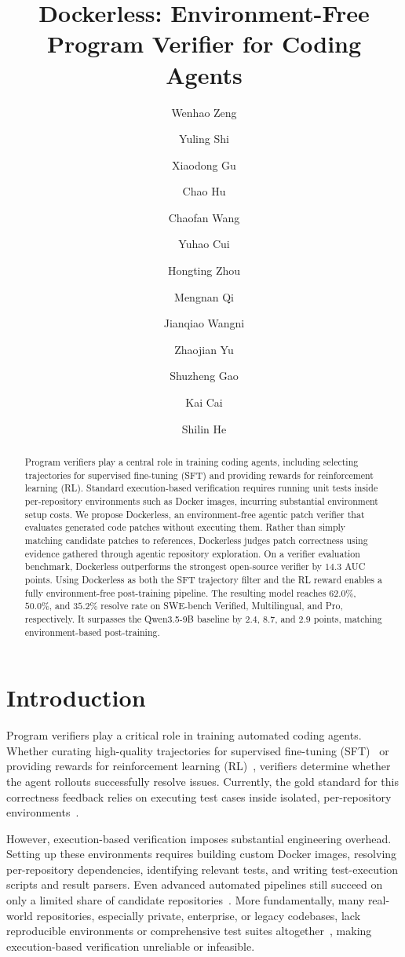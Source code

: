\documentclass{llmxive}
\title{Dockerless: Environment-Free Program Verifier for Coding Agents}
\author{Wenhao Zeng \and Yuling Shi \and Xiaodong Gu \and Chao Hu \and Chaofan Wang \and Yuhao Cui \and Hongting Zhou \and Mengnan Qi \and Jianqiao Wangni \and Zhaojian Yu \and Shuzheng Gao \and Kai Cai \and Shilin He}
\providecommand{\approach}{Dockerless\xspace}
\providecommand{\he}[1]{\textbf{[He: #1]}}
\begin{document}
\maketitle
\begin{abstract}
Program verifiers play a central role in training coding agents, including selecting trajectories for supervised fine-tuning (SFT) and providing rewards for reinforcement learning (RL).
  Standard execution-based verification requires running unit tests inside per-repository environments such as Docker images, incurring substantial environment setup costs.
  We propose \approach, an environment-free agentic patch verifier that evaluates generated code patches without executing them.
  Rather than simply matching candidate patches to references, \approach judges patch correctness using evidence gathered through agentic repository exploration.
  On a verifier evaluation benchmark, \approach outperforms the strongest open-source verifier by $14.3$ AUC points.
  Using \approach as both the SFT trajectory filter and the RL reward enables a fully environment-free post-training pipeline.
  The resulting model reaches $62.0\%$, $50.0\%$, and $35.2\%$ resolve rate on SWE-bench Verified, Multilingual, and Pro, respectively.
  It surpasses the Qwen3.5-9B baseline by $2.4$, $8.7$, and $2.9$ points, matching environment-based post-training.
\end{abstract}
\section{Introduction}
\label{sec:intro}

Program verifiers play a critical role in training automated coding agents. Whether curating high-quality trajectories for supervised fine-tuning (SFT)~\citep{yuan2023scaling,pan2025training,jain2025r2e,zeng2025pruning} or providing rewards for reinforcement learning (RL)~\citep{wei2025swerl,luo2025deepswe}, verifiers determine whether the agent rollouts successfully resolve issues. Currently, the gold standard for this correctness feedback relies on executing test cases inside isolated, per-repository environments~\citep{jimenez2024swe,pan2025training,jain2025r2e}.

However, execution-based verification imposes substantial engineering overhead.
Setting up these environments requires building custom Docker images, resolving per-repository dependencies, identifying relevant tests, and writing test-execution scripts and result parsers.
Even advanced automated pipelines still succeed on only a limited share of candidate repositories~\citep{jain2025r2e,badertdinov2026swe,li2026repolaunch,zhang2025swebenchgoeslive}.
More fundamentally, many real-world repositories, especially private, enterprise, or legacy codebases, lack reproducible environments or comprehensive test suites altogether~\citep{pan2025training,zan2026multi}, making execution-based verification unreliable or infeasible.
\end{document}
